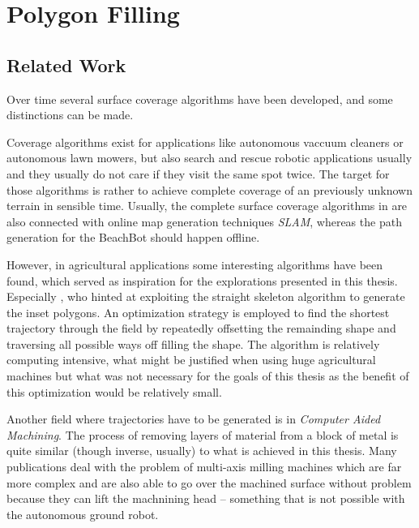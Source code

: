 \section{Polygon Filling}

\subsection{Related Work}

Over time several surface coverage algorithms have been developed, and some distinctions can be made. 

Coverage algorithms exist for applications like autonomous vaccuum cleaners or autonomous lawn mowers, but also search and rescue robotic applications usually and they usually do not care if they visit the same spot twice. The target for those algorithms is rather to achieve complete coverage of an previously unknown terrain in sensible time. Usually, the complete surface coverage algorithms in are also connected with online map generation techniques \textit{SLAM}, whereas the path generation for the BeachBot should happen offline.

However, in agricultural applications some interesting algorithms have been found, which served as inspiration for the explorations presented in this thesis. Especially \citep{ROB:ROB20300}, who hinted at exploiting the straight skeleton algorithm to generate the inset polygons. An optimization strategy is employed to find the shortest trajectory through the field by repeatedly offsetting the remainding shape and traversing all possible ways off filling the shape. The algorithm is relatively computing intensive, what might be justified when using huge agricultural machines but what was not necessary for the goals of this thesis as the benefit of this optimization would be relatively small.

Another field where trajectories have to be generated is in \textit{Computer Aided Machining}. The process of removing layers of material from a block of metal is quite similar (though inverse, usually) to what is achieved in this thesis. Many publications deal with the problem of multi-axis milling machines which are far more complex and are also able to go over the machined surface without problem because they can lift the machnining head -- something that is not possible with the autonomous ground robot. 


